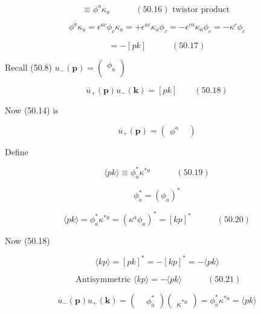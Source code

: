 \documentclass[twoside]{amsart}
\begin{document}
\begin{equation}
  [pk] \equiv \phi^a \kappa_a \quad \quad \quad (50.16) \text{ twistor product }
\end{equation}

\[
\phi^a \kappa_a = \epsilon^{ac} \phi_c \kappa_a = + \epsilon^{ac} \kappa_a \phi_c = - \epsilon^{ca} \kappa_a \phi_c = - \kappa^c \phi_c
\]

\begin{equation}
 [kp ] = -[pk] \quad \quad \quad (50.17)
\end{equation}

Recall (50.8) $u_-(\mathbf{p}) = \left( \begin{matrix} \phi_a \\ \end{matrix} \right)$

\begin{equation}
  \overline{u}_+(\mathbf{p}) u_-( \mathbf{k}) = [pk ] \quad \quad (50.18)
\end{equation}

Now  (50.14) is

\[
\overline{u}_+(\mathbf{p}) = (  \begin{matrix} \phi^a & \end{matrix} )
\]

Define 

\begin{equation}
\langle pk \rangle \equiv \phi^*_{\dot{a}} \kappa^{* \dot{a}} \quad \quad \quad (50.19)
\end{equation}

\[
\phi^*_{\dot{a}} = (\phi_a)^*
\]

\begin{equation}
\langle pk \rangle =  \phi^*_{\dot{a}} \kappa^{*\dot{a}} = (\kappa^a \phi_a)^* = [kp]^* \quad \quad \quad (50.20)
\end{equation}


Now (50.18)

\[
\langle kp \rangle = [pk]^* = - [kp]^* = -\langle pk \rangle 
\]

\[
\text{ Antisymmetric } \langle kp \rangle = - \langle pk \rangle \quad \quad \quad (50.21)
\]

\[
\overline{u}_-(\mathbf{p}) u_+(\mathbf{k}) = ( \begin{matrix} & \phi_{\dot{a}}^* \end{matrix} ) \left( \begin{matrix}  \\ \kappa^{* \dot{a}} \end{matrix} \right) = \phi^*_{\dot{a}} \kappa^{* \dot{a}} = \langle pk \rangle
\]
\end{document}
